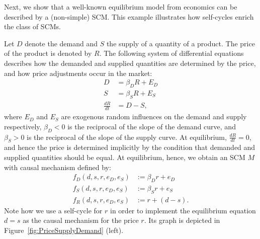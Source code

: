 Next, we show that a well-known equilibrium model from economics can be described by a (non-simple) SCM. 
This example illustrates how self-cycles enrich the class of SCMs.
\begin{Eg}
  \label{ex:PriceSupplyDemandDynamical}
Let $D$ denote the demand and $S$ the supply of a quantity of a product. The
price of the product is denoted by $R$. The following system of differential equations describes how the
demanded and supplied quantities are determined by the price, and how price
adjustments occur in the market:
$$
  \begin{aligned}
    D &= \beta_D R + E_D \\
    S &= \beta_S R + E_S \\
    \frac{dR}{dt} &= D - S,
  \end{aligned}
$$
where $E_D$ and $E_S$ are exogenous random influences on the demand and supply respectively, $\beta_D<0$ is the reciprocal of the slope of the demand curve, and $\beta_S>0$ is the reciprocal of the slope of the supply curve. At equilibrium, $\frac{dR}{dt}=0$, and hence the price is determined implicitly by the condition that demanded and supplied quantities should be equal.
At equilibrium, hence, we obtain an SCM $M$ with causal mechanism defined by:
$$
  \begin{aligned}
    f_D(d,s,r,e_D,e_S) &:= \beta_D r + e_D \\
    f_S(d,s,r,e_D,e_S) &:= \beta_S r + e_S \\
    f_R(d,s,r,e_D,e_S) &:= r + (d - s).
  \end{aligned}
$$
Note how we use a self-cycle for $r$ in order to implement the equilibrium
equation $d = s$ as the causal mechanism for the price $r$. 
Its graph is depicted in Figure~\ref{fig:PriceSupplyDemand} (left).
\begin{figure}\centering

\end{figure}
\end{Eg}
